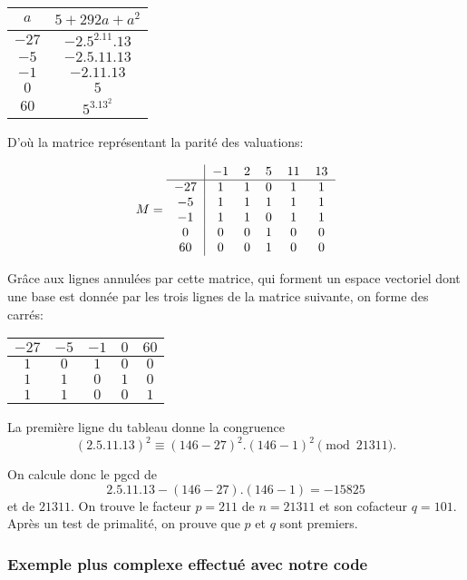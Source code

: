\documentclass[french, 12pt, titlepage]{article}
\begin{document}
\begin{center}
\begin{tabular}{c|c}
$a$ & $5 + 292a + a^2$\\
\hline
$-27$ & $-2.5^2.11.13$\\
$ -5$ & $-2.5.11.13$\\
$-1$ & $-2.11.13$\\
$0$ & $5$\\
$60$ & $5^3.13^2$\\
\end{tabular}
\end{center}

D'où la matrice représentant la parité des valuations:

\[ M = 
\begin{tabular}{c|ccccc}
 & $-1$ & $2$ & $5$ & $11$ & $13$\\
\hline
$-27$ & $1$ & $1$ & $0$ & $1$ & $1$\\
$ -5$ & $1$ & $1$ & $1$ & $1$ & $1$\\
$-1$ & $1$ & $1$ & $0$ & $1$ & $1$\\
$0$ & $0$ & $0$ & $1$ & $0$ & $0$\\
$60$ & $0$ & $0$ & $1$ & $0$ & $0$\\
\end{tabular}
\]

Grâce aux lignes annulées par cette matrice, qui forment un espace vectoriel dont une base est donnée par les trois lignes de la matrice suivante, on forme des carrés:

\begin{center}
\begin{tabular}{ccccc}
 $-27$ & $-5$ & $-1$ & $0$ & $60$\\
\hline
$1$ & $0$ & $1$ & $0$ & $0$\\
$1$ & $1$ & $0$ & $1$ & $0$\\
$1$ & $1$ & $0$ & $0$ & $1$\\
\end{tabular}
\end{center}

La première ligne du tableau donne la congruence \[ (2.5.11.13)^2 \equiv (146 - 27)^2.(146 - 1)^2 \pmod{21311} .\]

On calcule donc le pgcd de \[ 2.5.11.13 - (146 - 27).(146 - 1) = -15825 \] et de $21311.$ On trouve le facteur $p = 211$ de $n = 21311$ et son cofacteur $q = 101.$
Après un test de primalité, on prouve que $p$ et $q$ sont premiers.

\subsubsection{Exemple plus complexe effectué avec notre code}
\end{document}
